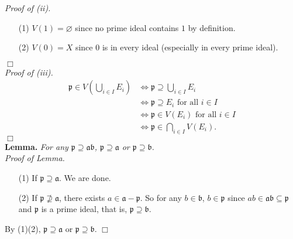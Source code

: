\documentclass{article}
\begin{document}
\emph{Proof of (ii).}
\begin{enumerate}
\item[(1)]
  \emph{$V(1) = \varnothing$} since no prime ideal contains $1$ by definition.

\item[(2)]
  \emph{$V(0) = X$} since $0$ is in every ideal (especially in every prime ideal).
\end{enumerate}
$\Box$ \\



\emph{Proof of (iii).}
\begin{align*}
  \mathfrak{p} \in V\left( \bigcup_{i \in I}E_i \right)
  &\Longleftrightarrow \mathfrak{p} \supseteq \bigcup_{i \in I}E_i \\
  &\Longleftrightarrow \mathfrak{p} \supseteq E_i \text{ for all } i \in I \\
  &\Longleftrightarrow \mathfrak{p} \in V(E_i) \text{ for all } i \in I \\
  &\Longleftrightarrow \mathfrak{p} \in \bigcap_{i \in I} V(E_i).
\end{align*}
$\Box$ \\



\textbf{Lemma.}
\emph{For any $\mathfrak{p} \supseteq \mathfrak{a} \mathfrak{b}$,
$\mathfrak{p} \supseteq \mathfrak{a}$ or $\mathfrak{p} \supseteq \mathfrak{b}$.} \\

\emph{Proof of Lemma.}
\begin{enumerate}
\item[(1)] If $\mathfrak{p} \supseteq \mathfrak{a}$. We are done.
\item[(2)] If $\mathfrak{p} \not\supseteq \mathfrak{a}$,
there exists $a \in \mathfrak{a} - \mathfrak{p}$.
So for any $b \in \mathfrak{b}$, $b \in \mathfrak{p}$
since $ab \in \mathfrak{ab} \subseteq \mathfrak{p}$ and $\mathfrak{p}$ is a prime ideal,
that is, $\mathfrak{p} \supseteq \mathfrak{b}$.
\end{enumerate}
By (1)(2), $\mathfrak{p} \supseteq \mathfrak{a}$ or $\mathfrak{p} \supseteq \mathfrak{b}$.
$\Box$ \\
\end{document}
